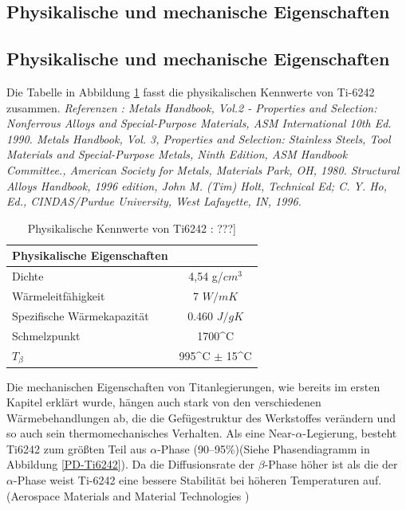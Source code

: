 \subsection{ Physikalische und mechanische Eigenschaften }
\subsection{Physikalische und mechanische Eigenschaften }

Die Tabelle in Abbildung \ref{Phy.eig.} fasst die physikalischen Kennwerte von Ti-6242 zusammen.
\newline
\textit{	Referenzen : 
	Metals Handbook, Vol.2 - Properties and Selection: Nonferrous Alloys and Special-Purpose Materials, ASM International 10th Ed. 1990.				
	Metals Handbook, Vol. 3, Properties and Selection: Stainless Steels, Tool Materials and Special-Purpose Metals, Ninth Edition, ASM Handbook Committee., American Society for Metals, Materials Park, OH, 1980.				
	Structural Alloys Handbook, 1996 edition, John M. (Tim) Holt, Technical Ed; C. Y. Ho, Ed., CINDAS/Purdue University, West Lafayette, IN, 1996. }

\begin{table}[H]
	\centering	
	\begin{tabular}{l c}
		
		Physikalische Eigenschaften & \\
		\hline
		Dichte& 4,54 g/$cm^3$\\
		Wärmeleitfähigkeit & 7 $W/mK$ \\
		Spezifische Wärmekapazität & 0.460 $J/gK$\\
		Schmelzpunkt & 1700^\circ C \\
		$T_{\beta}$ &  995^\circ C $\pm$ 15^\circ C \\
		\hline
		
	\end{tabular}
	\caption{Physikalische Kennwerte von Ti6242 : ???]}
	\label{Phy.eig.}
\end{table}


Die mechanischen Eigenschaften von Titanlegierungen, wie bereits im ersten Kapitel erklärt wurde, hängen auch stark von den verschiedenen Wärmebehandlungen ab, die die Gefügestruktur des Werkstoffes  verändern und so auch sein thermomechanisches Verhalten.
Als eine Near-$\alpha$-Legierung, besteht Ti6242 zum größten Teil aus $\alpha$-Phase (90--95\%)(Siehe Phasendiagramm in Abbildung \ref{PD-Ti6242}). Da die Diffusionsrate der $\beta$-Phase höher ist als die der $\alpha$-Phase weist Ti-6242 eine bessere Stabilität bei höheren Temperaturen auf. (Aerospace Materials and Material Technologies ) 

